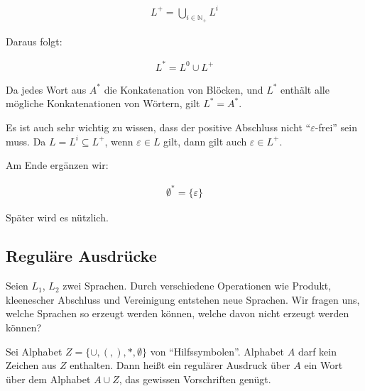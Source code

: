 \documentclass[12pt,a4paper,oneside]{article}
\newcommand{\afz}[1]{\enquote{#1}}
\newcommand{\emptyline}{\hspace*{\fill}}
\newcommand{\N}{\mathbb{N}}
\begin{document}
            \vspace{-1em}
            \begin{align*}
                L^+ = \bigcup_{i \in \N_+} L^i
            \end{align*}

            Daraus folgt:

            \vspace{-1em}
            \begin{align*}
                L^* = L^0 \cup L^+
            \end{align*}

            Da jedes Wort aus $A^*$ die Konkatenation von Blöcken, und $L^*$ enthält alle mögliche Konkatenationen von Wörtern,
            gilt $L^* = A^*$.

            \emptyline

            Es ist auch sehr wichtig zu wissen, dass der positive Abschluss nicht \afz{$\varepsilon$-frei} sein muss.
            Da $L = L^i \subseteq L^+$, wenn $\varepsilon \in L$ gilt, dann gilt auch $\varepsilon \in L^+$.
            
            \emptyline

            Am Ende ergänzen wir:

            \vspace{-1em}
            \begin{align*}
                \emptyset^* = \{\varepsilon\}
            \end{align*}

            Später wird es nützlich.

        \newpage

        \subsection{Reguläre Ausdrücke}

            Seien $L_1$, $L_2$ zwei Sprachen.
            Durch verschiedene Operationen wie Produkt, kleenescher Abschluss und Vereinigung entstehen neue Sprachen.
            Wir fragen uns, welche Sprachen so erzeugt werden können, welche davon nicht erzeugt werden können?

            \emptyline

            Sei Alphabet $Z = \{\cup, (, ), *, \emptyset\}$ von \afz{Hilfssymbolen}.
            Alphabet $A$ darf kein Zeichen aus $Z$ enthalten.
            Dann heißt ein regulärer Ausdruck über $A$ ein Wort über dem Alphabet $A \cup Z$,
            das gewissen Vorschriften genügt.
\end{document}
